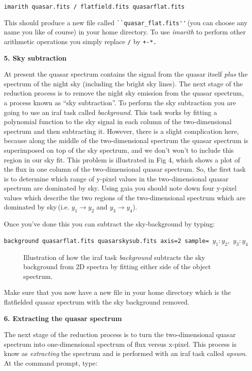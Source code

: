 {\tt imarith quasar.fits \verb,/, flatfield.fits quasarflat.fits}

This should produce a new file called \verb,``quasar_flat.fits'',\,(you can choose any name you like of course) in your home directory. To use {\it imarith} to perform other arithmetic operations you simply replace \verb,/, by \verb,+-*.,

{\large {\bf 5. Sky subtraction}}

At present the quasar spectrum contains the signal from the quasar itself {\it plus} the spectrum of the night sky (including the bright sky lines). The next stage of the reduction process is to remove the night sky emission from the quasar spectrum, a process known as ``sky subtraction''. To perform the sky subtraction you are going to use an {\sc iraf} task called {\it background}. This task works by fitting a polynomial function to the sky signal in each column of the two-dimensional spectrum and then subtracting it. However, there is a slight complication here, because along the middle of the two-dimensional spectrum the quasar spectrum is superimposed on top of the sky spectrum, and we don't won't to include this region in our sky fit. This problem is illustrated in Fig 4, which shows a plot of the flux in one column of the two-dimensional quasar spectrum. So, the first task is to determine which range of y-pixel values in the two-dimensional quasar spectrum are dominated by sky. Using {\sc gaia} you should note down four y-pixel values which describe the two regions of the two-dimensional spectrum which are dominated by sky\,(i.e. $y_1 \rightarrow y_2$ and $y_3 \rightarrow y_4$).

Once you've done this you can subtract the sky-background by typing:

{\tt background quasarflat.fits quasarskysub.fits axis=2 sample= }$y_1:y_2,$ $y_3:y_4$

\begin{figure}
\centerline{}
\caption{Illustration of how the {\sc iraf} task {\it background} subtracts the sky background from 2D spectra by fitting either side of the object spectrum.}
\end{figure}

Make sure that you now have a new file in your home directory which is the flatfielded quasar spectrum with the sky background removed.

{\large {\bf 6. Extracting the quasar spectrum }}

The next stage of the reduction process is to turn the two-dimensional quasar spectrum into one-dimensional spectrum of flux versus x-pixel. This process is know as {\it extracting} the spectrum and is performed with an {\sc iraf} task called {\it apsum}. At the command prompt, type:

